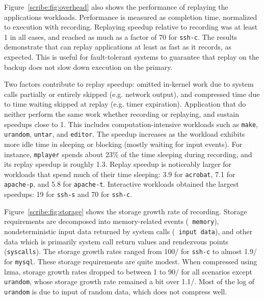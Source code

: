 Figure~\ref{scribe:fig:overhead} also shows the performance of replaying the
applications workloads. Performance is measured as completion time,
normalized to execution with recording. Replaying speedup relative to
recording was at least 1 in all cases, and reached as much as a factor
of 70 for {\tt ssh-c}. The results demonstrate that \scribe{} can
replay applications at least as fast as it records, as expected. This
is useful for fault-tolerant systems to guarantee that replay on the
backup does not slow down execution on the primary.

Two factors contribute to replay speedup: omitted in-kernel work due
to system calls partially or entirely skipped (e.g. network output),
and compressed time due to time waiting skipped at replay (e.g. timer
expiration). Application that do neither perform the same work whether
recording or replaying, and sustain speedups close to 1. This includes
computation-intensive workloads such as {\tt make}, {\tt urandom},
{\tt untar}, and {\tt editor}. The speedup increases as the workload
exhibits more idle time in sleeping or blocking (mostly waiting for
input events). For instance, {\tt mplayer} spends about 23\% of the
time sleeping during recording, and its replay speedup is roughly
1.3. Replay speedup is noticeably larger for workloads
that spend much of their time sleeping: 3.9 for {\tt acrobat},
7.1 for {\tt apache-p}, and 5.8 for {\tt apache-t}.
Interactive workloads obtained
the largest speedups: 19 for {\tt ssh-s} and 70 for {\tt ssh-c}.

Figure~\ref{scribe:fig:storage} shows the storage growth rate of recording.
Storage requirements are decomposed into memory-related events ({\tt
  memory}), nondeterministic input data returned by system calls ({\tt
  input data}), and other data which is primarily system call return
values and rendezvous points ({\tt syscalls}).  The storage growth
rates ranged from 100\KB{}/\secs{} for {\tt ssh-c} to almost
1.9\MB{}/\secs{} for {\tt mysql}.  These storage requirements are
quite modest.  When compressed using lzma, storage growth rates
dropped to between 1 to 90\KB{}/\secs{} for all scenarios except {\tt
  urandom}, whose storage growth rate 
remained a bit over 1.1\MB{}/\secs{}.  Most of the log of
{\tt urandom} is due to input of random data, which does not compress
well.  

